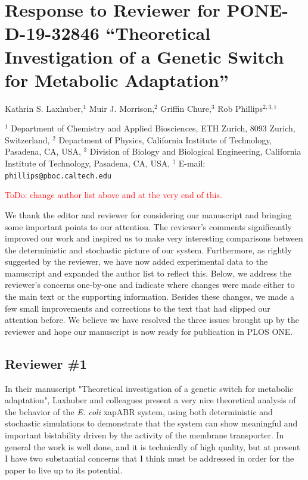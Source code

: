 \documentclass[11pt,letterpaper]{article}
\begin{document}
\section*{Response to Reviewer for PONE-D-19-32846 ``Theoretical Investigation of a Genetic Switch for Metabolic Adaptation''}
Kathrin S. Laxhuber,$^{1}$ Muir J. Morrison,$^{2}$ Griffin Chure,$^{3}$ Rob Phillips$^{2, 3, \dagger}$
\vspace{10pt}

\noindent\tiny{$^1$ Department of Chemistry and Applied Biosciences, ETH Zurich, 8093 Zurich, Switzerland,
$^2$ Department of Physics, California Institute of Technology, Pasadena, CA, USA,
$^3$ Division of Biology and Biological Engineering, California Institute of Technology, Pasadena, CA, USA, $^\dagger$ E-mail: \texttt{phillips@pboc.caltech.edu}}

{\Large\textcolor{red}{ToDo: change author list above and at the very end of this.}}

\begin{responseSummary}
We thank the editor and reviewer for considering our manuscript and
bringing some important points to our attention. The reviewer's comments
significantly improved our work and inspired us to make very interesting
comparisons between the deterministic and stochastic picture of our
system. Furthermore, as rightly suggested by the reviewer, we have now
added experimental data to the manuscript and expanded the author list
to reflect this. Below, we address the reviewer's concerns one-by-one
and indicate where changes were made either to the main text or the
supporting information. Besides these changes, we made a few small
improvements and corrections to the text that had slipped our attention before. We
believe we have resolved the three issues brought up by the reviewer and
hope our manuscript is now ready for publication in PLOS ONE.
\end{responseSummary}

\subsection*{Reviewer \#1}
\begin{review}
In their manuscript "Theoretical investigation of a genetic switch for
metabolic adaptation", Laxhuber and colleagues present a very nice
theoretical analysis of the behavior of the \emph{E. coli} xapABR system, using
both deterministic and stochastic simulations to demonstrate that the
system can show meaningful and important bistability driven by the
activity of the membrane transporter. In general the work is well done,
and it is technically of high quality, but at present I have two
substantial concerns that I think must be addressed in order for the
paper to live up to its potential.
\end{review}
\end{document}
